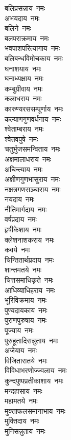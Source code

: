 \begin{flushleft}
\begin{multicols}{2}
बलिप्रसन्नाय~नमः\\
अभयदाय~नमः\\
बलिने~नमः\\
बलपराक्रमाय~नमः\\
भवपाशपरित्यागाय~नमः\\
बलिबन्धविमोचकाय~नमः\\
घनाशयाय~नमः\\
घनाध्यक्षाय~नमः\\
कम्बुग्रीवाय~नमः\\
कलाधराय~नमः\hfill{}\\
कारुण्यरससम्पूर्णाय~नमः\\
कल्याणगुणवर्धनाय~नमः\\
श्वेताम्बराय~नमः\\
श्वेतवपुषे~नमः\\
चतुर्भुजसमन्विताय~नमः\\
अक्षमालाधराय~नमः\\
अचिन्त्याय~नमः\\
अक्षीणगुणभासुराय~नमः\\
नक्षत्रगणसञ्चाराय~नमः\\
नयदाय~नमः\hfill{}\\
नीतिमार्गदाय~नमः\\
वर्षप्रदाय~नमः\\
हृषीकेशाय~नमः\\
क्लेशनाशकराय~नमः\\
कवये~नमः\\
चिन्तितार्थप्रदाय~नमः\\
शान्तमतये~नमः\\
चित्तसमाधिकृते~नमः\\
आधिव्याधिहराय~नमः\\
भूरिविक्रमाय~नमः\hfill{}\\
पुण्यदायकाय~नमः\\
पुराणपुरुषाय~नमः\\
पूज्याय~नमः\\
पुरुहूतादिसन्नुताय~नमः\\
अजेयाय~नमः\\
विजितारातये~नमः\\
विविधाभरणोज्ज्वलाय~नमः\\
कुन्दपुष्पप्रतीकाशाय~नमः\\
मन्दहासाय~नमः\\
महामतये~नमः\hfill{}\\
मुक्ताफलसमानाभाय~नमः\\
मुक्तिदाय~नमः\\
मुनिसन्नुताय~नमः\\

\end{multicols}
\end{flushleft}
